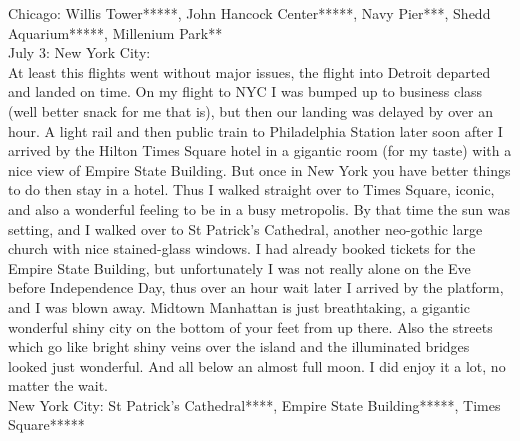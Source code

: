 Chicago: Willis Tower*****, John Hancock Center*****, Navy Pier***, Shedd Aquarium*****, Millenium Park**\\

July 3: New York City:\\
At least this flights went without major issues, the flight into Detroit departed and landed on time. On my flight to NYC I was bumped up to business class (well better snack for me that is), but then our landing was delayed by over an hour. A light rail and then public train to Philadelphia Station later soon after I arrived by the Hilton Times Square hotel in a gigantic room (for my taste) with a nice view of Empire State Building. But once in New York you have better things to do then stay in a hotel. Thus I walked straight over to Times Square, iconic, and also a wonderful feeling to be in a busy metropolis. By that time the sun was setting, and I walked over to St Patrick's Cathedral, another neo-gothic large church with nice stained-glass windows. I had already booked tickets for the Empire State Building, but unfortunately I was not really alone on the Eve before Independence Day, thus over an hour wait later I arrived by the platform, and I was blown away. Midtown Manhattan is just breathtaking, a gigantic wonderful shiny city on the bottom of your feet from up there. Also the streets which go like bright shiny veins over the island and the illuminated bridges looked just wonderful. And all below an almost full moon. I did enjoy it a lot, no matter the wait.\\

New York City: St Patrick's Cathedral****, Empire State Building*****, Times Square*****\\

